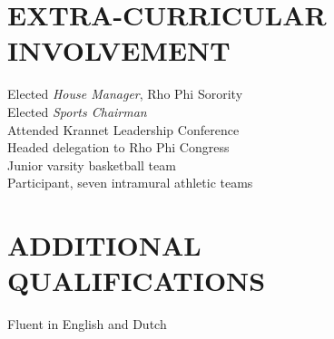 \documentclass[margin]{res}
\begin{document}
\begin{resume}
\section{EXTRA-CURRICULAR \\ INVOLVEMENT}             
            Elected {\it House Manager}, Rho Phi Sorority \\
            Elected {\it Sports Chairman} \\
            Attended Krannet Leadership Conference \\
                Headed delegation to Rho Phi Congress \\
                Junior varsity basketball team \\
                Participant, seven intramural athletic teams 
 
\section{ADDITIONAL \\QUALIFICATIONS}
			Fluent in English and Dutch

\end{resume}
\end{document}
